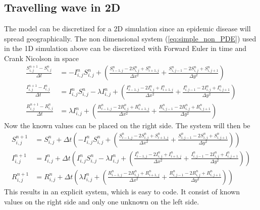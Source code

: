 \documentclass[%
twoside,                 %
final,                   %
10pt]{article}
\begin{document}
\subsection{Travelling wave in 2D}
The model can be discretized for a 2D simulation since an epidemic disease will spread geographically. The non dimensional system (\ref{eq:simple_non_PDE}) used in the 1D simulation above can be discretized with Forward Euler in time and Crank Nicolson in space
\begin{equation} \label{eq:SIR_disc}
	\begin{aligned}
    \frac{S^{n+1}_{i,j}-S^n_{i,j}}{\Delta t} &= -I^{n}_{i,j}S^{n}_{i,j} + \left(\frac{S^{n}_{i-1,j}-2S^{n}_{i,j}+S^{n}_{i+1,j}}{\Delta x^2}+\frac{S^{n}_{i,j-1}-2S^{n}_{i,j}+S^{n}_{i,j+1}}{\Delta y^2}\right) \\
    \frac{I^{n+1}_{i,j}-I^n_{i,j}}{\Delta t} &= I^{n}_{i,j}S^{n}_{i,j} -\lambda I^{n}_{i,j} + \left(\frac{I^{n}_{i-1,j}-2I^{n}_{i,j}+I^{n}_{i+1,j}}{\Delta x^2}+\frac{I^{n}_{i,j-1}-2I^{n}_{i,j}+I^{n}_{i,j+1}}{\Delta y^2}\right) \\
    \frac{R^{n+1}_{i,j}-R^n_{i,j}}{\Delta t} &= \lambda I^{n}_{i,j}+\left(\frac{R^{n}_{i-1,j}-2R^{n}_{i,j}+R^{n}_{i+1,j}}{\Delta x^2}+\frac{R^{n}_{i,j-1}-2R^{n}_{i,j}+R^{n}_{i,j+1}}{\Delta y^2}\right) 
	\end{aligned}
\end{equation}
Now the known values can be placed on the right side. The system will then be
\begin{equation}
	\begin{aligned}
    S^{n+1}_{i,j} &= S^{n}_{i,j}+\Delta t\left(-I^{n}_{i,j}S^{n}_{i,j} + \left(\frac{S^{n}_{i-1,j}-2S^{n}_{i,j}+S^{n}_{i+1,j}}{\Delta x^2}+\frac{S^{n}_{i,j-1}-2S^{n}_{i,j}+S^{n}_{i,j+1}}{\Delta y^2}\right)\right) \\
    I^{n+1}_{i,j} &= I^{n}_{i,j}+\Delta t\left(I^{n}_{i,j}S^{n}_{i,j} -\lambda I^{n}_{i,j} + \left(\frac{I^{n}_{i-1,j}-2I^{n}_{i,j}+I^{n}_{i+1,j}}{\Delta x^2}+\frac{I^{n}_{i,j-1}-2I^{n}_{i,j}+I^{n}_{i,j+1}}{\Delta y^2}\right)\right) \\
    R^{n+1}_{i,j} &= R^{n}_{i,j}+\Delta t\left(\lambda I^{n}_{i,j}+\left(\frac{R^{n}_{i-1,j}-2R^{n}_{i,j}+R^{n}_{i+1,j}}{\Delta x^2}+\frac{R^{n}_{i,j-1}-2R^{n}_{i,j}+R^{n}_{i,j+1}}{\Delta y^2}\right)\right) 
	\end{aligned}
\end{equation}
This results in an explicit system, which is easy to code. It consist of known values on the right side and only one unknown on the left side.
\end{document}

